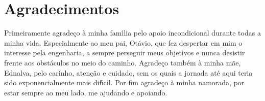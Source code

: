 % 


\section*{Agradecimentos}

Primeiramente agrade\c{c}o \`{a} minha fam\'{\i}lia pelo apoio incondicional durante todas a minha vida. Especialmente ao meu pai, Ot\'{a}vio, que fez despertar em mim o interesse pela engenharia, a sempre perseguir meus objetivos e nunca desistir frente aos obst\'{a}culos no meio do caminho. Agrade\c{c}o tamb\'{e}m \`{a} minha m\~{a}e, Ednalva, pelo carinho, aten\c{c}\~{a}o e cuidado, sem os quais a jornada at\'{e} aqui teria sido exponencialmente mais dif\'{\i}cil. 
Por fim agrade\c{c}o \`{a} minha namorada, por estar sempre ao meu lado, me ajudando e apoiando.


